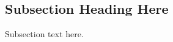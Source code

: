 \documentclass[final, a4paper]{IEEEtran}
\begin{document}
\subsection{Subsection Heading Here}
Subsection text here.




%


%


%




%
\end{document}

